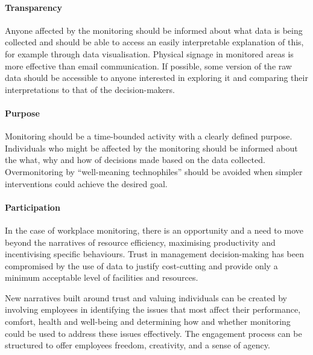 \paragraph{Transparency} Anyone affected by the monitoring should be
informed about what data is being collected and should be able to
access an easily interpretable explanation of this, for example
through data visualisation. Physical signage in monitored areas is
more effective than email communication. If possible, some version of
the raw data should be accessible to anyone interested in exploring it
and comparing their interpretations to that of the decision-makers. 

\paragraph{Purpose} Monitoring should be a time-bounded activity with
a clearly defined purpose. Individuals who might be affected by the
monitoring should be informed about the what, why and how of decisions
made based on the data collected. Overmonitoring by “well-meaning
technophiles” should be avoided when simpler interventions could
achieve the desired goal. 

\paragraph{Participation} In the case of workplace monitoring, there
is an opportunity and a need to move beyond the narratives of resource
efficiency, maximising productivity and incentivising specific
behaviours. Trust in management decision-making has been compromised
by the use of data to justify cost-cutting and provide only a minimum
acceptable level of facilities and resources. 


New narratives built around trust and valuing individuals can be
created by involving employees in identifying the issues that most
affect their performance, comfort, health and well-being and
determining how and whether monitoring could be used to address these
issues effectively. The engagement process can be structured to offer
employees freedom, creativity, and a sense of agency. 



